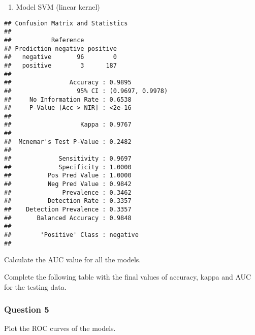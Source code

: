 \documentclass[]{article}
\newenvironment{Shaded}{\begin{snugshade}}{\end{snugshade}}
\newcommand{\DataTypeTok}[1]{\textcolor[rgb]{0.13,0.29,0.53}{#1}}
\newcommand{\KeywordTok}[1]{\textcolor[rgb]{0.13,0.29,0.53}{\textbf{#1}}}
\newcommand{\NormalTok}[1]{#1}
\newcommand{\OperatorTok}[1]{\textcolor[rgb]{0.81,0.36,0.00}{\textbf{#1}}}
\newcommand{\StringTok}[1]{\textcolor[rgb]{0.31,0.60,0.02}{#1}}
\providecommand{\tightlist}{%
  \setlength{\itemsep}{0pt}\setlength{\parskip}{0pt}}
\begin{document}
\begin{enumerate}
\def\labelenumi{\arabic{enumi}.}
\setcounter{enumi}{4}
\tightlist
\item
  Model SVM (linear kernel)
\end{enumerate}

\begin{Shaded}
\end{Shaded}

\begin{verbatim}
## Confusion Matrix and Statistics
## 
##           Reference
## Prediction negative positive
##   negative       96        0
##   positive        3      187
##                                           
##                Accuracy : 0.9895          
##                  95% CI : (0.9697, 0.9978)
##     No Information Rate : 0.6538          
##     P-Value [Acc > NIR] : <2e-16          
##                                           
##                   Kappa : 0.9767          
##                                           
##  Mcnemar's Test P-Value : 0.2482          
##                                           
##             Sensitivity : 0.9697          
##             Specificity : 1.0000          
##          Pos Pred Value : 1.0000          
##          Neg Pred Value : 0.9842          
##              Prevalence : 0.3462          
##          Detection Rate : 0.3357          
##    Detection Prevalence : 0.3357          
##       Balanced Accuracy : 0.9848          
##                                           
##        'Positive' Class : negative        
## 
\end{verbatim}

Calculate the AUC value for all the models.

Complete the following table with the final values of accuracy, kappa
and AUC for the testing data.

\hypertarget{question-5}{%
\subsubsection{Question 5}\label{question-5}}

Plot the ROC curves of the models.
\end{document}
